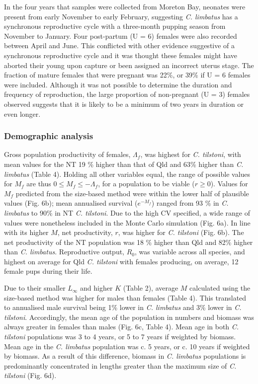 \documentclass[]{article}
\begin{document}
In the four years that samples were collected from Moreton Bay, neonates
were present from early November to early February, suggesting \emph{C.
limbatus} has a synchronous reproductive cycle with a three-month
pupping season from November to January. Four post-partum (U = 6)
females were also recorded between April and June. This conflicted with
other evidence suggestive of a synchronous reproductive cycle and it was
thought these females might have aborted their young upon capture or
been assigned an incorrect uterus stage. The fraction of mature females
that were pregnant was 22\%, or 39\% if U = 6 females were included.
Although it was not possible to determine the duration and frequency of
reproduction, the large proportion of non-pregnant (U = 3) females
observed suggests that it is likely to be a minimum of two years in
duration or even longer.

\subsubsection{Demographic analysis}\label{demographic-analysis-1}

Gross population productivity of females, \(\Lambda_f\), was highest for
\emph{C. tilstoni}, with mean values for the NT 19 \% higher than that
of Qld and 63\% higher than \emph{C. limbatus} (Table 4). Holding all
other variables equal, the range of possible values for \(M_f\) are thus
\(0 \leq M_f \leq -\Lambda_f\), for a population to be viable
(\(r \geq 0\)). Values for \(M_f\) predicted from the size-based method
were within the lower half of plausible values (Fig. 6b); mean
annualised survival (\(e^{-M_f}\)) ranged from 93 \% in \emph{C.
limbatus} to 90\% in NT \emph{C. tilstoni}. Due to the high CV
specified, a wide range of values were nonetheless included in the Monte
Carlo simulation (Fig. 6a). In line with its higher \(M\), net
productivity, \(r\), was higher for \emph{C. tilstoni} (Fig. 6b). The
net productivity of the NT population was 18 \% higher than Qld and 82\%
higher than \emph{C. limbatus}. Reproductive output, \(R_0\), was
variable across all species, and highest on average for Qld \emph{C.
tilstoni} with females producing, on average, 12 female pups during
their life.

Due to their smaller \(L_\infty\) and higher \(K\) (Table 2), average
\(M\) calculated using the size-based method was higher for males than
females (Table 4). This translated to annualised male survival being 1\%
lower in \emph{C. limbatus} and 3\% lower in \emph{C. tilstoni}.
Accordingly, the mean age of the population in numbers and biomass was
always greater in females than males (Fig. 6c, Table 4). Mean age in
both \emph{C. tilstoni} populations was 3 to 4 years, or 5 to 7 years if
weighted by biomass. Mean age in the \emph{C. limbatus} population was
c. 5 years, or c. 10 years if weighted by biomass. As a result of this
difference, biomass in \emph{C. limbatus} populations is predominantly
concentrated in lengths greater than the maximum size of \emph{C.
tilstoni} (Fig. 6d).
\end{document}
